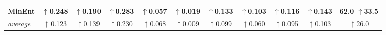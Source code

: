 \begin{landscape}
\begin{table}[p]
\begin{tabular}{lcccccccccc}
			MinEnt      & $\uparrow$0.248 & $\uparrow$0.190 & $\uparrow$0.283 & $\uparrow$0.057 & $\uparrow$0.019 & $\uparrow$0.133 & $\uparrow$0.103 & $\uparrow$0.116 & $\uparrow$0.143 & \textbf{62.0} $\uparrow$33.5 \\
			
			\midrule
			
			\textit{average} &$\uparrow$0.123 & $\uparrow$0.139 & $\uparrow$0.230 & $\uparrow$0.068 & $\uparrow$0.009 & $\uparrow$0.099 & $\uparrow$0.060 & $\uparrow$0.095 & $\uparrow$0.103 & $\uparrow$26.0 \\  %
			
			\bottomrule
	\end{tabular}%
	\label{tab:ablation_aug}
\end{table}
\end{landscape}
